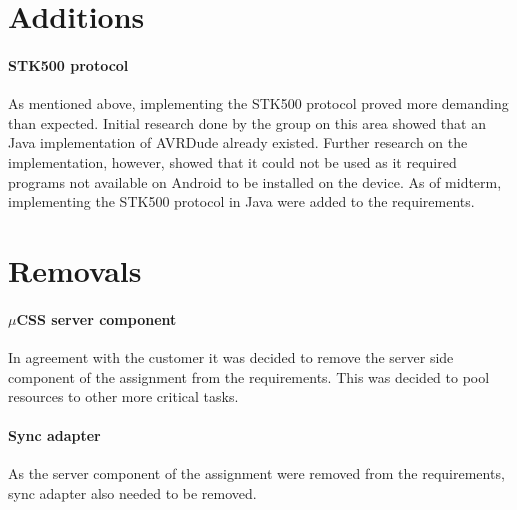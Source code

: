 \section{Additions}
\paragraph{STK500 protocol} As mentioned above, implementing the STK500 protocol proved more demanding than expected. Initial research done by the group on this area showed that an Java implementation of AVRDude already existed. Further research on the implementation, however, showed that it could not be used as it required programs not available on Android to be installed on the device. As of midterm, implementing the STK500 protocol in Java were added to the requirements.

\section{Removals}
\paragraph{$\mu$CSS server component} In agreement with the customer it was decided to remove the server side component of the assignment from the requirements. This was decided to pool resources to other more critical tasks.

\paragraph{Sync adapter} As the server component of the assignment were removed from the requirements, sync adapter also needed to be removed.

